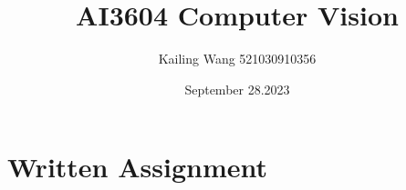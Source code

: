 \documentclass{article}
\theoremstyle{definition}
\begin{document}
	\title{AI3604 Computer Vision}
	\author{Kailing Wang 521030910356}
	\date{September 28.2023}
	\maketitle
	\section*{Written Assignment}
%			
%			
%			
\end{document}
